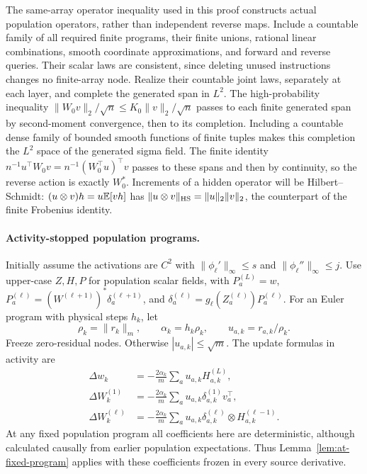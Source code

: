 The same-array operator inequality used in this proof constructs actual
population operators, rather than independent reverse maps.  Include a
countable family of all required finite programs, their finite unions,
rational linear combinations, smooth coordinate approximations, and
forward and reverse queries.  Their scalar laws are consistent, since
deleting unused instructions changes no finite-array node.  Realize their
countable joint laws, separately at each layer, and complete the generated
span in $L^2$.  The high-probability inequality
$\|W_0v\|_2/\sqrt n\le K_0\|v\|_2/\sqrt n$ passes to each finite generated
span by second-moment convergence, then to its completion.  Including
a countable dense family of bounded smooth functions of finite tuples
makes this completion the $L^2$ space of the generated sigma field.
The finite identity
$n^{-1}u^\top W_0v=n^{-1}(W_0^\top u)^\top v$ passes to these spans
and then by continuity, so the reverse action is exactly $W_0^*$.
Increments of a hidden operator will be Hilbert--Schmidt:
$(u\otimes v)h=u\mathbb{E}[vh]$ has
$\|u\otimes v\|_{\rm HS}=\|u\|_2\|v\|_2$, the counterpart of the
finite Frobenius identity.

\paragraph{Activity-stopped population programs.}
Initially assume the activations are $C^2$ with
$\|\phi_\ell'\|_\infty\le s$ and $\|\phi_\ell''\|_\infty\le j$.
Use upper-case $Z,H,P$ for population scalar fields, with
$P_a^{(L)}=w$, $P_a^{(\ell)}=(W^{(\ell+1)})^*\delta_a^{(\ell+1)}$,
and $\delta_a^{(\ell)}=g_\ell(Z_a^{(\ell)})P_a^{(\ell)}$.
For an Euler program with physical steps $h_k$, let
\[
 \rho_k=\|r_k\|_m,\qquad \alpha_k=h_k\rho_k,\qquad
 u_{a,k}=r_{a,k}/\rho_k .
\]
Freeze zero-residual nodes.  Otherwise $|u_{a,k}|\le\sqrt m$.
The update formulas in activity are
\begin{align}
 \Delta w_k&=-\frac{2\alpha_k}{m}\sum_a u_{a,k}H_{a,k}^{(L)},\nonumber\\
 \Delta W_k^{(1)}&=-\frac{2\alpha_k}{m}\sum_a
                  u_{a,k}\delta_{a,k}^{(1)}v_a^\top,\nonumber\\
 \Delta W_k^{(\ell)}&=-\frac{2\alpha_k}{m}\sum_a
                  u_{a,k}\delta_{a,k}^{(\ell)}\otimes H_{a,k}^{(\ell-1)}.
 \label{eq:at-pop-euler}
\end{align}
At any fixed population program all coefficients here are deterministic,
although calculated causally from earlier population expectations.
Thus Lemma~\ref{lem:at-fixed-program} applies with these coefficients
frozen in every source derivative.

